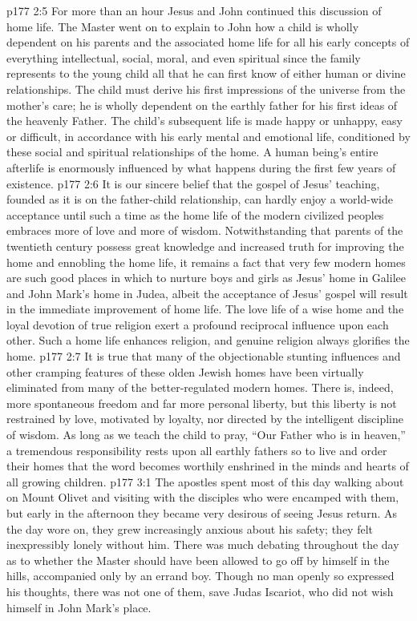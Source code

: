 \vs p177 2:5 For more than an hour Jesus and John continued this discussion of home life. The Master went on to explain to John how a child is wholly dependent on his parents and the associated home life for all his early concepts of everything intellectual, social, moral, and even spiritual since the family represents to the young child all that he can first know of either human or divine relationships. The child must derive his first impressions of the universe from the mother’s care; he is wholly dependent on the earthly father for his first ideas of the heavenly Father. The child’s subsequent life is made happy or unhappy, easy or difficult, in accordance with his early mental and emotional life, conditioned by these social and spiritual relationships of the home. A human being’s entire afterlife is enormously influenced by what happens during the first few years of existence.
\pc \vs p177 2:6 It is our sincere belief that the gospel of Jesus’ teaching, founded as it is on the father\hyp{}child relationship, can hardly enjoy a world\hyp{}wide acceptance until such a time as the home life of the modern civilized peoples embraces more of love and more of wisdom. Notwithstanding that parents of the twentieth century possess great knowledge and increased truth for improving the home and ennobling the home life, it remains a fact that very few modern homes are such good places in which to nurture boys and girls as Jesus’ home in Galilee and John Mark’s home in Judea, albeit the acceptance of Jesus’ gospel will result in the immediate improvement of home life. The love life of a wise home and the loyal devotion of true religion exert a profound reciprocal influence upon each other. Such a home life enhances religion, and genuine religion always glorifies the home.\plusone
\vs p177 2:7 It is true that many of the objectionable stunting influences and other cramping features of these olden Jewish homes have been virtually eliminated from many of the better\hyp{}regulated modern homes. There is, indeed, more spontaneous freedom and far more personal liberty, but this liberty is not restrained by love, motivated by loyalty, nor directed by the intelligent discipline of wisdom. As long as we teach the child to pray, “Our Father who is in heaven,” a tremendous responsibility rests upon all earthly fathers so to live and order their homes that the word  becomes worthily enshrined in the minds and hearts of all growing children.
\vs p177 3:1 The apostles spent most of this day walking about on Mount Olivet and visiting with the disciples who were encamped with them, but early in the afternoon they became very desirous of seeing Jesus return. As the day wore on, they grew increasingly anxious about his safety; they felt inexpressibly lonely without him. There was much debating throughout the day as to whether the Master should have been allowed to go off by himself in the hills, accompanied only by an errand boy. Though no man openly so expressed his thoughts, there was not one of them, save Judas Iscariot, who did not wish himself in John Mark’s place.
